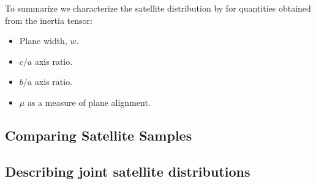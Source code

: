 \documentclass[a4paper,fleqn,usenatbib]{mnras}
\begin{document}
To summarize we characterize the satellite distribution by for
quantities obtained from the inertia tensor: 
\begin{itemize}
\item Plane width, $w$.
\item $c/a$ axis ratio.
\item $b/a$ axis ratio.
\item $\mu$ as a measure of plane alignment.
\end{itemize}


\subsection{Comparing Satellite Samples}

\subsection{Describing joint satellite distributions}



\end{document}
